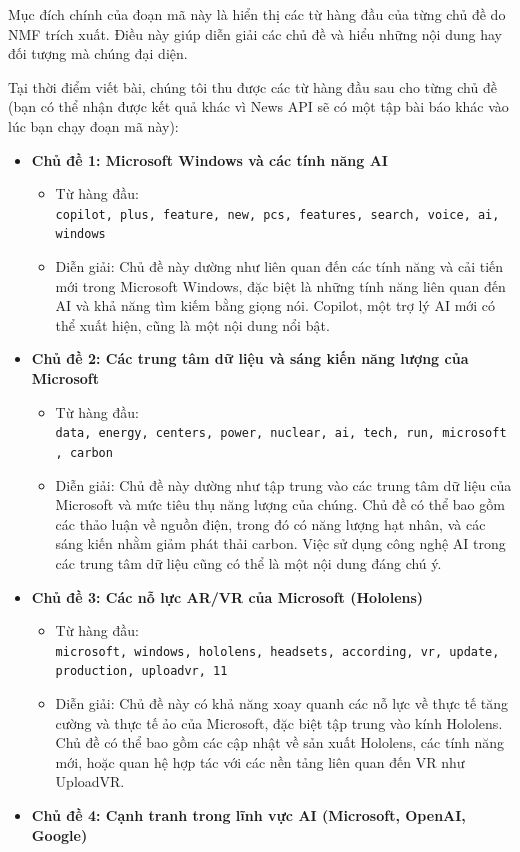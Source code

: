Mục đích chính của đoạn mã này là hiển thị các từ hàng đầu của từng chủ đề do NMF trích xuất. Điều này giúp diễn giải các chủ đề và hiểu những nội dung hay đối tượng mà chúng đại diện.

Tại thời điểm viết bài, chúng tôi thu được các từ hàng đầu sau cho từng chủ đề (bạn có thể nhận được kết quả khác vì News API sẽ có một tập bài báo khác vào lúc bạn chạy đoạn mã này):

\begin{itemize}
\item
  \textbf{Chủ đề 1: Microsoft Windows và các tính năng AI}

  \begin{itemize}
    \item
    Từ hàng đầu: \texttt{copilot,\ plus,\ feature,\ new,\ pcs,\ features,\ search,\ voice,\ ai,\ windows}
  \item
    Diễn giải: Chủ đề này dường như liên quan đến các tính năng và cải tiến mới trong Microsoft Windows, đặc biệt là những tính năng liên quan đến AI và khả năng tìm kiếm bằng giọng nói. Copilot, một trợ lý AI mới có thể xuất hiện, cũng là một nội dung nổi bật.
  \end{itemize}
\item
  \textbf{Chủ đề 2: Các trung tâm dữ liệu và sáng kiến năng lượng của Microsoft}

  \begin{itemize}
    \item
    Từ hàng đầu: \texttt{data,\ energy,\ centers,\ power,\ nuclear,\ ai,\ tech,\ run,\ microsoft,\ carbon}
  \item
    Diễn giải: Chủ đề này dường như tập trung vào các trung tâm dữ liệu của Microsoft và mức tiêu thụ năng lượng của chúng. Chủ đề có thể bao gồm các thảo luận về nguồn điện, trong đó có năng lượng hạt nhân, và các sáng kiến nhằm giảm phát thải carbon. Việc sử dụng công nghệ AI trong các trung tâm dữ liệu cũng có thể là một nội dung đáng chú ý.
  \end{itemize}
\item
  \textbf{Chủ đề 3: Các nỗ lực AR/VR của Microsoft (Hololens)}

  \begin{itemize}
    \item
    Từ hàng đầu: \texttt{microsoft,\ windows,\ hololens,\ headsets,\ according,\ vr,\ update,\ production,\ uploadvr,\ 11}
  \item
    Diễn giải: Chủ đề này có khả năng xoay quanh các nỗ lực về thực tế tăng cường và thực tế ảo của Microsoft, đặc biệt tập trung vào kính Hololens. Chủ đề có thể bao gồm các cập nhật về sản xuất Hololens, các tính năng mới, hoặc quan hệ hợp tác với các nền tảng liên quan đến VR như UploadVR.
  \end{itemize}
\item
  \textbf{Chủ đề 4: Cạnh tranh trong lĩnh vực AI (Microsoft, OpenAI, Google)}


\end{itemize}
